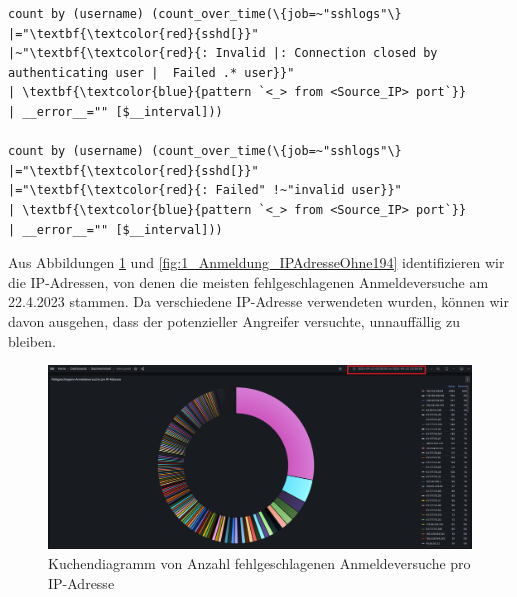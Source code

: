{
\begin{Verbatim}[fontsize=\small,commandchars=\\\{\},frame=single]
count by (username) (count_over_time(\{job=~"sshlogs"\} 
|="\textbf{\textcolor{red}{sshd[}}"
|~"\textbf{\textcolor{red}{: Invalid |: Connection closed by authenticating user |  Failed .* user}}"
| \textbf{\textcolor{blue}{pattern `<_> from <Source_IP> port`}}
| __error__="" [$__interval]))

count by (username) (count_over_time(\{job=~"sshlogs"\}
|="\textbf{\textcolor{red}{sshd[}}"
|="\textbf{\textcolor{red}{: Failed" !~"invalid user}}"
| \textbf{\textcolor{blue}{pattern `<_> from <Source_IP> port`}}
| __error__="" [$__interval]))
\end{Verbatim}
}

Aus Abbildungen \ref{fig:1_Anmeldung_IPAdresse} und \ref{fig:1_Anmeldung_IPAdresseOhne194} identifizieren wir die IP-Adressen, von denen die meisten fehlgeschlagenen Anmeldeversuche am 22.4.2023 stammen. Da verschiedene IP-Adresse verwendeten wurden, können wir davon ausgehen, dass der potenzieller Angreifer versuchte, unnauffällig zu bleiben. 

\newpage
{}
\thispagestyle{lscape}
\begin{landscape}
    \begin{figure}[H]
        \centerline{\includegraphics[width=1.6\textwidth]{assets/Failed_pro_ip.png}}
        \caption[Kuchendiagramm von Anzahl fehlgeschlagenen Anmeldeversuche pro IP-Adresse]
        {Kuchendiagramm von Anzahl fehlgeschlagenen Anmeldeversuche pro IP-Adresse}
        \label{fig:1_Anmeldung_IPAdresse}
        \centering
    \end{figure}
\end{landscape}
\restoregeometry

